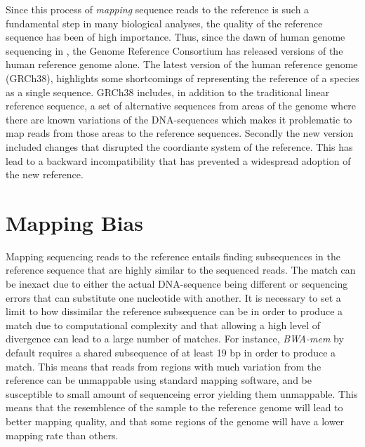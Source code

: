Since this process of \emph{mapping} sequence reads to the reference is such a fundamental step in many biological analyses, the quality of the reference sequence has been of high importance.
Thus, since the dawn of human genome sequencing in , the Genome Reference Consortium has released  versions of the human reference genome alone.
The latest version of the human reference genome (GRCh38), highlights some shortcomings of representing the reference of a species as a single sequence.
GRCh38 includes, in addition to the traditional linear reference sequence, a set of alternative sequences from areas of the genome where there are known variations of the DNA-sequences which makes it problematic to map reads from those areas to the reference sequences.
Secondly the new version included changes that disrupted the coordiante system of the reference.
This has lead to a backward incompatibility that has prevented a widespread adoption of the new reference.

\section{Mapping Bias}
Mapping sequencing reads to the reference entails finding subsequences in the reference sequence that are highly similar to the sequenced reads.
The match can be inexact due to either the actual DNA-sequence being different or sequencing errors that can substitute one nucleotide with another.
It is necessary to set a limit to how dissimilar the reference subsequence can be in order to produce a match due to computational complexity and that allowing a high level of divergence can lead to a large number of matches.
For instance, \emph{BWA-mem} by default requires a shared subsequence of at least 19 bp in order to produce a match.
This means that reads from regions with much variation from the reference can be unmappable using standard mapping software, and be susceptible to small amount of sequenceing error yielding them unmappable.
This means that the resemblence of the sample to the reference genome will lead to better mapping quality, and that some regions of the genome will have a lower mapping rate than others. 


